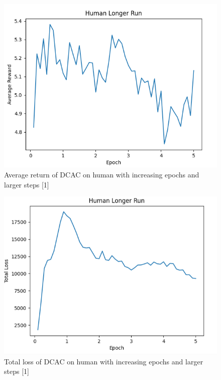 \documentclass{article} %
\begin{document}
\begin{figure}[H]
\begin{center}
\includegraphics[scale=0.3]{images/longer_human_reward.png}
\end{center}
\caption{Average return of DCAC on human with increasing epochs and larger steps [1]}
\label{humanLongerReturn}
\end{figure}

\begin{figure}[H]
\begin{center}
\includegraphics[scale=0.3]{images/longer_human_loss.png}
\end{center}
\caption{Total loss of DCAC on human with increasing epochs and larger steps [1]}
\label{humanLongerLoss}
\end{figure}
\end{document}
